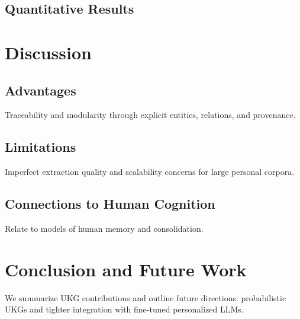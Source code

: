 \documentclass[10pt]{article}
\begin{document}
\subsection{Quantitative Results}



\section{Discussion}
\subsection{Advantages}
Traceability and modularity through explicit entities, relations, and provenance.

\subsection{Limitations}
Imperfect extraction quality and scalability concerns for large personal corpora.

\subsection{Connections to Human Cognition}
Relate to models of human memory and consolidation.

\section{Conclusion and Future Work}
We summarize UKG contributions and outline future directions: probabilistic UKGs and tighter integration with fine-tuned personalized LLMs.



\end{document}
